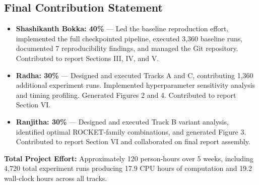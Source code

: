 \documentclass[conference]{IEEEtran}
\begin{document}
\subsection*{Final Contribution Statement}

\begin{itemize}
  \item \textbf{Shashikanth Bokka: 40\%} --- Led the baseline reproduction
        effort, implemented the full checkpointed pipeline, executed 3,360
        baseline runs, documented 7 reproducibility findings, and managed the
        Git repository. Contributed to report Sections III, IV, and V.
        
  \item \textbf{Radha: 30\%} --- Designed and executed Tracks A and C,
        contributing 1,360 additional experiment runs. Implemented hyperparameter
        sensitivity analysis and timing profiling. Generated Figures 2 and 4.
        Contributed to report Section VI.
        
  \item \textbf{Ranjitha: 30\%} --- Designed and executed Track B variant
        analysis, identified optimal ROCKET-family combinations, and generated
        Figure 3. Contributed to report Section VI and collaborated on final
        report assembly.
\end{itemize}

\textbf{Total Project Effort:} Approximately 120 person-hours over 5 weeks,
including 4,720 total experiment runs producing 17.9 CPU hours of computation
and 19.2 wall-clock hours across all tracks.
\end{document}
